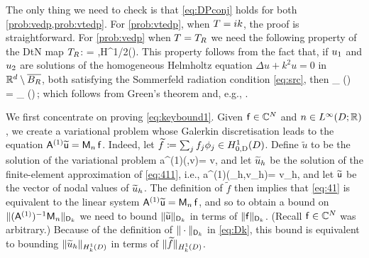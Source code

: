 The only thing we need to check is that \cref{eq:DPconj} holds for both \cref{prob:vedp,prob:vtedp}. For \cref{prob:vtedp}, when $T = ik$, the proof is straightforward. For \cref{prob:vedp} when $T = T_{R}$ we need the following property of the DtN map $T_{R}$:
\beq\label{eq:DtN}
\DPGR{\DtN\psi}{\phibar} = \DPGR{\DtN \phi}{\psibar} \quad\tfa \phi,\psi \in H^{1/2}(\GR).
\eeq
This property follows from the fact that, if $u_{1}$ and $u_{2}$ are solutions of the homogeneous Helmholtz equation $\Delta u +k^2 u=0$ in $\mathbb R^{d}\setminus \overline{B_{R}}$, both satisfying the Sommerfeld radiation condition \cref{eq:src}, then
\beqs
\int_{\GR} (\gamma \uo)\, \dn \utb = \int_{\GR} (\gamma \ut)\,\dn \uob;
\eeqs
which follows from Green's theorem and, e.g., \cite[Lemma 4.10]{Sp:15}.
\epf



\label{page:lemkeylemma1proof}
We first concentrate on proving \cref{eq:keybound1}.
Given $\mathsf{f} \in \mathbb C^N$ and $n\in \LiDRR$, we create a variational problem whose Galerkin discretisation leads to the equation $\mathsf{A}^{(1)} \widetilde{\mathsf{u}} = \mathsf{M}_n\,\mathsf{f}$.
Indeed, let $\widetilde{f} \de \sum_j f_j \phi_j\in \HozDD$. Define $\widetilde{u}$ to be the solution of the variational problem 
\beq\label{eq:411}
a^{(1)}(,v)=  \quad{} v\in \HozDD,
\eeq
and let $\widetilde{u}_h$ be the solution of the finite-element approximation of \cref{eq:411}, i.e.,
\beq\label{eq:41}
a^{(1)}(\tu_h,v_h)=  \quad{} v_h\in \Vhp,
\eeq
and let $\widetilde{\mathsf{u}}$ be the vector of nodal values of $\widetilde{u}_h$. The definition of $\widetilde{f}$ then implies that \cref{eq:41} is equivalent to the linear system $\mathsf{A}^{(1)} \widetilde{\mathsf{u}} = \mathsf{M}_{n}\,\mathsf{f}$, and so to obtain a bound on $\|(\mathsf{A}^{(1)})^{-1}\mathsf{M}_n\|_{\mathsf{D}_k}$ we need to bound $\|\widetilde{\mathsf{u}}\|_{\mathsf{D}_k}$ in terms of $\|\mathsf{f}\|_{\mathsf{D}_k}$. (Recall $\mathsf{f} \in \mathbb C^{N}$ was arbitrary.) Because of the definition 
of $\|\cdot\|_{\mathsf{D}_k}$ in \cref{eq:Dk}, this bound is equivalent to bounding $\|\tu_h\|_{\HokD}$ in terms of $\|\widetilde{f}\|_{\HokD}$.



